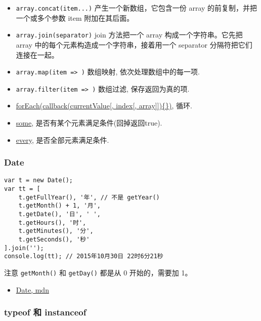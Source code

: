 \begin{itemize}
\tightlist
\item
  \lstinline!array.concat(item...)! 产生一个新数组，它包含一份 array
  的前复制，并把一个或多个参数 item 附加在其后面。
\item
  \lstinline!array.join(separator)! join 方法把一个 array
  构成一个字符串。它先把 array 中的每个元素构造成一个字符串，接着用一个
  separator 分隔符把它们连接在一起。
\item
  \lstinline!array.map(item => )! 数组映射, 依次处理数组中的每一项.
\item
  \lstinline!array.filter(item => )! 数组过滤, 保存返回为真的项.
\item
  \href{https://developer.mozilla.org/en-US/docs/Web/JavaScript/Reference/Global_Objects/Array/forEach}{forEach(callback(currentValue{[},
  index{[}, array{]}{]})\{\})}, 循环.
\item
  \href{https://developer.mozilla.org/en-US/docs/Web/JavaScript/Reference/Global_Objects/Array/some}{some},
  是否有某个元素满足条件(回掉返回true).
\item
  \href{https://developer.mozilla.org/en-US/docs/Web/JavaScript/Reference/Global_Objects/Array/every}{every},
  是否全部元素满足条件.
\end{itemize}

\subsubsection{Date}\label{date}

\begin{lstlisting}
var t = new Date();
var tt = [
    t.getFullYear(), '年', // 不是 getYear()
    t.getMonth() + 1, '月',
    t.getDate(), '日', ' ',
    t.getHours(), '时',
    t.getMinutes(), '分',
    t.getSeconds(), '秒'
].join('');
console.log(tt); // 2015年10月30日 22时6分21秒
\end{lstlisting}

注意 \lstinline!getMonth()! 和 \lstinline!getDay()! 都是从 0
开始的，需要加 1。

\begin{itemize}
\tightlist
\item
  \href{https://developer.mozilla.org/en-US/docs/Web/JavaScript/Reference/Global_Objects/Date}{Date,
  mdn}
\end{itemize}

\subsubsection{typeof 和 instanceof}\label{typeof-ux548c-instanceof}

